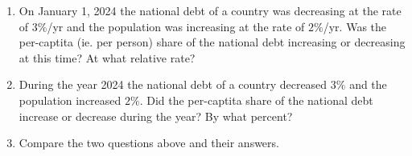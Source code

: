 \documentclass{ximera}
\begin{document}
\begin{exercise}  \label{Ekhkhglcbbg}
\begin{enumerate}
\item On January 1, 2024 the national debt of a country was decreasing at the rate of $3\%$/yr and the population was increasing at the rate of $2\%$/yr.  Was the per-captita (ie. per person) share of the national debt increasing or decreasing at this time? At what relative rate?

\item During the year 2024 the national debt of a country decreased $3\%$ and the population increased $2\%$.  Did the per-captita share of the national debt increase or decrease during the year? By what percent?

\item Compare the two questions above and their answers.

\end{enumerate}



\end{exercise}
\end{document}
